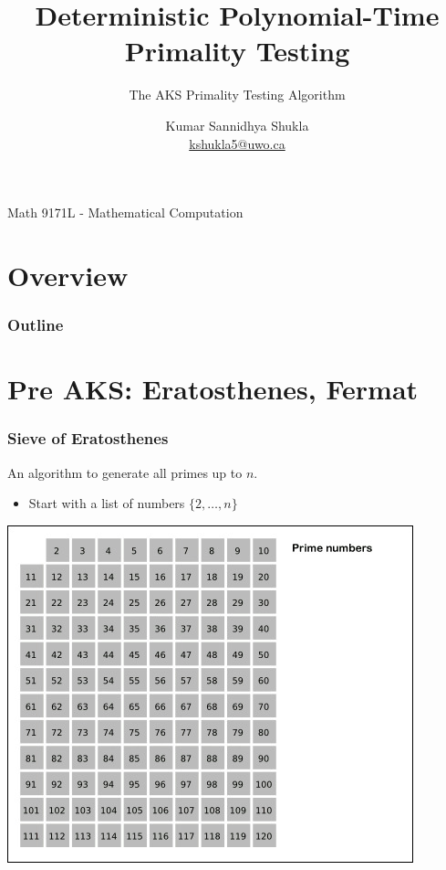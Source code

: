 \documentclass[11pt]{beamer}
\begin{document}
  \author[Kumar]{Kumar Sannidhya Shukla \\ \tiny\hyperlink{mailto:kshukla5@uwo.ca}{kshukla5@uwo.ca}}
  \date{}
  \title[AKS]{Deterministic Polynomial-Time Primality Testing}
  \subtitle{The AKS Primality Testing Algorithm}
  \subject{Math 9171L - Mathematical Computation}

\begin{frame}
  \maketitle
  \centering
  Math 9171L - Mathematical Computation
\end{frame}

\section*{Overview}
\begin{frame}
\frametitle{Outline}
\tableofcontents
\end{frame}

\section{Pre AKS: Eratosthenes, Fermat }

\begin{frame}
\frametitle{Sieve of Eratosthenes}
An algorithm to generate all primes up to $n$.
\centering
\begin{itemize}
  \item Start with a list of numbers $\{2, \dots, n\}$
\end{itemize}
    \includegraphics[scale=0.45]{resources/sieve-0.jpg}
\end{frame}
\end{document}
